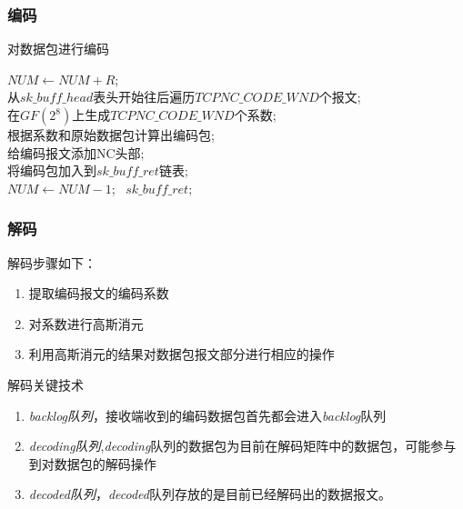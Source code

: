 \begin{frame}
	\frametitle{编码}
\begin{algorithm}
	\caption{对数据包进行编码} 
	\label{algo:bianma}
	$NUM \leftarrow NUM+R$;\\
	{  
		从$sk\_buff\_head$表头开始往后遍历$TCPNC\_CODE\_WND$个报文;\\
		在$GF\left(2^8\right)$上生成$TCPNC\_CODE\_WND$个系数;\\
		根据系数和原始数据包计算出编码包;\\
		给编码报文添加NC头部;\\
		将编码包加入到$sk\_buff\_ret$链表;\\
		$NUM \leftarrow NUM-1$;
	}
	\Return \ $sk\_buff\_ret$;
\end{algorithm}


\end{frame}

\begin{frame}
	\frametitle{解码}
	解码步骤如下：
	\begin{enumerate}
		\item 提取编码报文的编码系数
		\item 对系数进行高斯消元
		\item 利用高斯消元的结果对数据包报文部分进行相应的操作
	\end{enumerate}
	\begin{block}{解码关键技术}
		\begin{enumerate}
			\item \emph{backlog队列}，接收端收到的编码数据包首先都会进入\emph{backlog}队列
			\item \emph{decoding队列},\emph{decoding}队列的数据包为目前在解码矩阵中的数据包，可能参与到对数据包的解码操作
			\item \emph{decoded队列}，\emph{decoded}队列存放的是目前已经解码出的数据报文。
		\end{enumerate}
	\end{block}
\end{frame}

